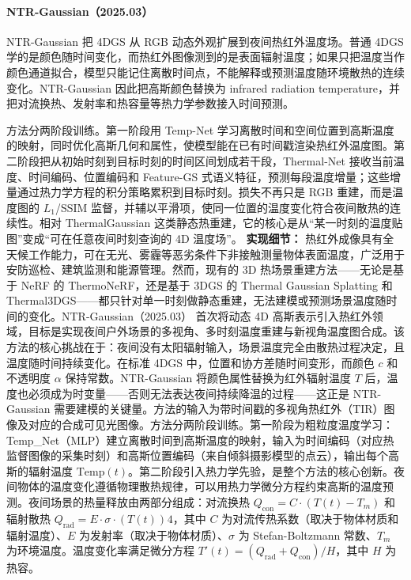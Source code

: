 \paragraph{NTR-Gaussian（2025.03）\cite{2503_03115}}
NTR-Gaussian 把 4DGS 从 RGB 动态外观扩展到夜间热红外温度场。普通 4DGS 学的是颜色随时间变化，而热红外图像测到的是表面辐射温度；如果只把温度当作颜色通道拟合，模型只能记住离散时间点，不能解释或预测温度随环境散热的连续变化。NTR-Gaussian 因此把高斯颜色替换为 infrared radiation temperature，并把对流换热、发射率和热容量等热力学参数接入时间预测。

方法分两阶段训练。第一阶段用 Temp-Net 学习离散时间和空间位置到高斯温度的映射，同时优化高斯几何和属性，使模型能在已有时间戳渲染热红外温度图。第二阶段把从初始时刻到目标时刻的时间区间划成若干段，Thermal-Net 接收当前温度、时间编码、位置编码和 Feature-GS 式语义特征，预测每段温度增量；这些增量通过热力学方程的积分策略累积到目标时刻。损失不再只是 RGB 重建，而是温度图的 $L_1$/SSIM 监督，并辅以平滑项，使同一位置的温度变化符合夜间散热的连续性。相对 ThermalGaussian 这类静态热重建，它的核心是从“某一时刻的温度贴图”变成“可在任意夜间时刻查询的 4D 温度场”。
\textbf{实现细节：} 热红外成像具有全天候工作能力，可在无光、雾霾等恶劣条件下非接触测量物体表面温度，广泛用于安防巡检、建筑监测和能源管理。然而，现有的 3D 热场景重建方法——无论是基于 NeRF 的 ThermoNeRF，还是基于 3DGS 的 Thermal Gaussian Splatting 和 Thermal3DGS——都只针对单一时刻做静态重建，无法建模或预测场景温度随时间的变化。NTR-Gaussian（2025.03） 首次将动态 4D 高斯表示引入热红外领域，目标是实现夜间户外场景的多视角、多时刻温度重建与新视角温度图合成。该方法的核心挑战在于：夜间没有太阳辐射输入，场景温度完全由散热过程决定，且温度随时间持续变化。在标准 4DGS 中，位置和协方差随时间变形，而颜色 $c$ 和不透明度 $\alpha$ 保持常数。NTR-Gaussian 将颜色属性替换为红外辐射温度 $T$ 后，温度也必须成为时变量——否则无法表达夜间持续降温的过程——这正是 NTR-Gaussian 需要建模的关键量。方法的输入为带时间戳的多视角热红外（TIR）图像及对应的合成可见光图像。方法分两阶段训练。第一阶段为粗粒度温度学习：Temp\_Net（MLP）建立离散时间到高斯温度的映射，输入为时间编码（对应热监督图像的采集时刻）和高斯位置编码（来自倾斜摄影模型的点云），输出每个高斯的辐射温度 $\mathrm{Temp}(t)$。第二阶段引入热力学先验，是整个方法的核心创新。夜间物体的温度变化遵循物理散热规律，可以用热力学微分方程约束高斯的温度预测。夜间场景的热量释放由两部分组成：对流换热 $Q_{\mathrm{con}} = C \cdot (T(t) - T_m)$ 和辐射散热 $Q_{\mathrm{rad}} = E \cdot \sigma \cdot (T(t))^{}4$，其中 $C$ 为对流传热系数（取决于物体材质和辐射温度）、$E$ 为发射率（取决于物体材质）、$\sigma$ 为 Stefan-Boltzmann 常数、$T_m$ 为环境温度。温度变化率满足微分方程 $T'(t) = (Q_{\mathrm{rad}} + Q_{\mathrm{con}}) / H$，其中 $H$ 为热容。
